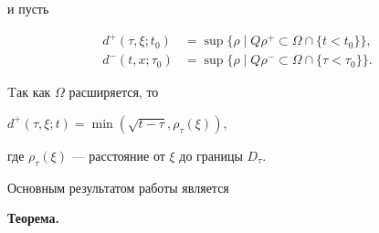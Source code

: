 и пусть


\begin{align*}


d^{+}(\tau,\xi;t_0)&=\sup\{ \rho\mid Q\rho^{+} \subset\Omega


\cap \{ t<t_0\} \},\\


d^{-}(t,x;\tau_0)&=\sup\{ \rho\mid Q\rho^{-} \subset\Omega


\cap \{ \tau<\tau_0\} \}.


\end{align*}


Tак как $\Omega$ расширяется, то 


$d^{+}(\tau,\xi;t)=\min(\sqrt{t-\tau},\rho_\tau(\xi))$,


где $\rho_\tau(\xi)$ --- расстояние от $\xi$ до границы $D_\tau$.





Основным результатом работы является


\medskip





{\bf Теорема.} 



